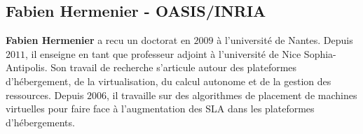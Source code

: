 \documentclass[a4paper]{article}
\begin{document}
\subsection{Fabien Hermenier - OASIS/INRIA}
\textbf{Fabien Hermenier} a recu un doctorat en $2009$ à l'université
de Nantes. Depuis $2011$, il enseigne en tant que professeur adjoint
à l'université de Nice Sophia-Antipolis. Son travail de recherche
s'articule autour des plateformes d'hébergement, de la virtualisation,
du calcul autonome et de la gestion des ressources. Depuis $2006$, il
travaille sur des algorithmes de placement de machines virtuelles pour
faire face à l'augmentation des SLA dans les plateformes d'hébergements.

\newpage
{}


\end{document}

